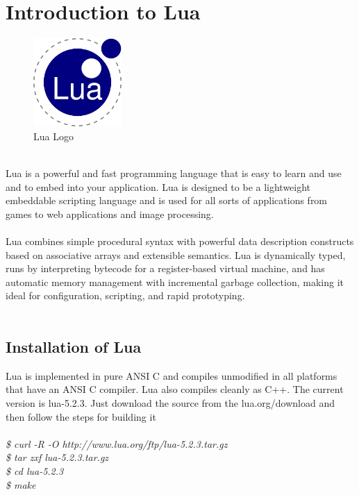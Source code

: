 \section{Introduction to Lua}
\begin{figure}[!ht]
\centering
\includegraphics[width=0.3\textwidth]{images/lua.png}
\caption{Lua Logo}
\hspace{-1.5em}
\end{figure}
\leavevmode\\
Lua is a powerful and fast programming language that is easy to learn and use and to embed into your application. Lua is designed to be a lightweight embeddable scripting language and is used for all sorts of applications from games to web applications and image processing.\\\\
Lua combines simple procedural syntax with powerful data description constructs based on associative arrays and extensible semantics. Lua is dynamically typed, runs by interpreting bytecode for a register-based virtual machine, and has automatic memory management with incremental garbage collection, making it ideal for configuration, scripting, and rapid prototyping.\\\\

\subsection{Installation of Lua}
Lua is implemented in pure ANSI C and compiles unmodified in all platforms that have an ANSI C compiler. Lua also compiles cleanly as C++. The current version is lua-5.2.3. Just download the source from the lua.org/download and then follow the steps for building it\\\\
\emph{
\$ curl -R -O http://www.lua.org/ftp/lua-5.2.3.tar.gz\\
\$ tar zxf lua-5.2.3.tar.gz\\
\$ cd lua-5.2.3\\
\$ make
}

\leavevmode\\\\

